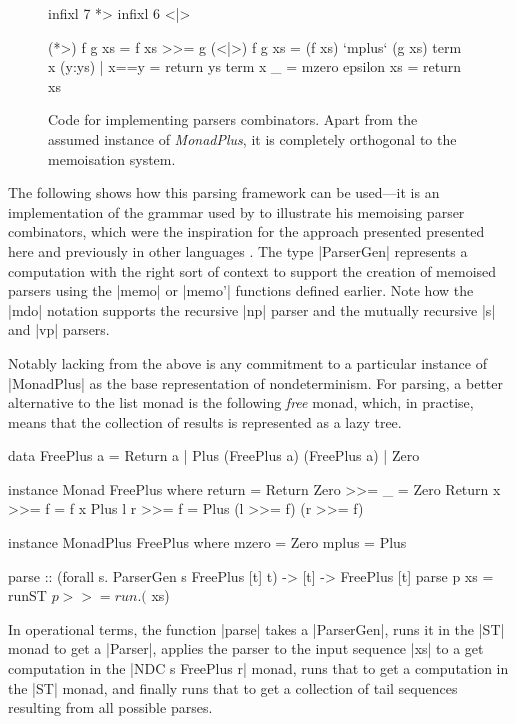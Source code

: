 \documentclass[a4paper,10pt]{article}
\begin{document}
\begin{figure}
\begin{haskell}
	infixl 7 *>
	infixl 6 <|>

	(*>)  f g xs = f xs >>= g
	(<|>) f g xs = (f xs) `mplus` (g xs)
	term x (y:ys) | x==y = return ys
	term x _ = mzero
	epsilon xs = return xs 
\end{haskell}
\caption{Code for implementing parsers combinators. Apart from the assumed
instance of \emph{MonadPlus}, it is completely orthogonal to the memoisation system. }
\end{figure}

The following shows how this parsing framework can be used---it is an implementation
of the grammar used by \cite{Johnson1995} to illustrate his memoising parser combinators,
which were the inspiration for the approach presented presented here
and previously in other languages \citep{Abdallah2017a,Abdallah2017b}.
The type |ParserGen| represents a computation with the right sort of
context to support the creation of memoised parsers using the |memo| or |memo'| functions
defined earlier.
Note how the |mdo| notation supports the recursive |np| parser and the mutually
recursive |s| and |vp| parsers.
Notably lacking from the above is any commitment to a particular instance of |MonadPlus| as
the base representation of nondeterminism. For parsing, a better alternative to the list
monad is the following \emph{free} monad, which, in practise, means that the collection of results
is represented as a lazy tree. 
\begin{haskell}
  data FreePlus a = Return a | Plus (FreePlus a) (FreePlus a) | Zero

  instance Monad FreePlus where
    return = Return
    Zero     >>= _ = Zero
    Return x >>= f = f x
    Plus l r >>= f = Plus (l >>= f) (r >>= f)

  instance MonadPlus FreePlus where
    mzero  = Zero
    mplus  = Plus

  parse :: (forall s. ParserGen s FreePlus [t] t) -> [t] -> FreePlus [t]
  parse p xs = runST $ p >>= run . ($ xs)
\end{haskell}
In operational terms, the function |parse| takes a |ParserGen|, runs it in the |ST| monad to get
a |Parser|, applies the parser to the input sequence |xs| to a get computation
in the |NDC s FreePlus r| monad, runs that to get a computation in the |ST| monad,
and finally runs that to get a collection of tail sequences resulting from all
possible parses.
\end{document}
